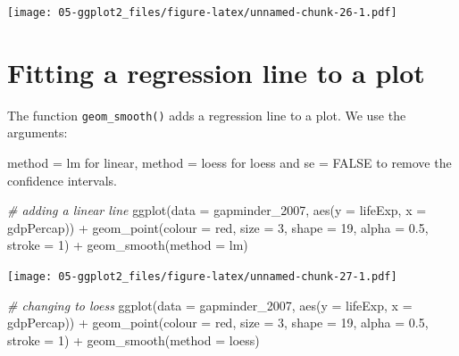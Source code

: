 \documentclass[
]{book}
\newenvironment{Shaded}{\begin{snugshade}}{\end{snugshade}}
\newcommand{\AttributeTok}[1]{\textcolor[rgb]{0.77,0.63,0.00}{#1}}
\newcommand{\CommentTok}[1]{\textcolor[rgb]{0.56,0.35,0.01}{\textit{#1}}}
\newcommand{\DecValTok}[1]{\textcolor[rgb]{0.00,0.00,0.81}{#1}}
\newcommand{\FloatTok}[1]{\textcolor[rgb]{0.00,0.00,0.81}{#1}}
\newcommand{\FunctionTok}[1]{\textcolor[rgb]{0.00,0.00,0.00}{#1}}
\newcommand{\NormalTok}[1]{#1}
\newcommand{\SpecialCharTok}[1]{\textcolor[rgb]{0.00,0.00,0.00}{#1}}
\newcommand{\StringTok}[1]{\textcolor[rgb]{0.31,0.60,0.02}{#1}}
\begin{document}
\texttt{[image: 05-ggplot2\_files/figure-latex/unnamed-chunk-26-1.pdf]}

\hypertarget{fitting-a-regression-line-to-a-plot}{%
\section{Fitting a regression line to a plot}\label{fitting-a-regression-line-to-a-plot}}

The function \texttt{geom\_smooth()} adds a regression line to a plot. We use the arguments:

method = lm for linear,
method = loess for loess and
se = FALSE to remove the confidence intervals.

\begin{Shaded}
\begin{Highlighting}[]
\CommentTok{\# adding a linear line}
\FunctionTok{ggplot}\NormalTok{(}\AttributeTok{data =}\NormalTok{ gapminder\_2007, }\FunctionTok{aes}\NormalTok{(}\AttributeTok{y =}\NormalTok{ lifeExp, }\AttributeTok{x =}\NormalTok{ gdpPercap)) }\SpecialCharTok{+} 
  \FunctionTok{geom\_point}\NormalTok{(}\AttributeTok{colour =} \StringTok{\textquotesingle{}red\textquotesingle{}}\NormalTok{, }\AttributeTok{size =} \DecValTok{3}\NormalTok{, }\AttributeTok{shape =} \DecValTok{19}\NormalTok{, }\AttributeTok{alpha =} \FloatTok{0.5}\NormalTok{, }\AttributeTok{stroke =} \DecValTok{1}\NormalTok{) }\SpecialCharTok{+}
  \FunctionTok{geom\_smooth}\NormalTok{(}\AttributeTok{method =}\NormalTok{ lm)}
\end{Highlighting}
\end{Shaded}

\texttt{[image: 05-ggplot2\_files/figure-latex/unnamed-chunk-27-1.pdf]}

\begin{Shaded}
\begin{Highlighting}[]
\CommentTok{\# changing to loess}
\FunctionTok{ggplot}\NormalTok{(}\AttributeTok{data =}\NormalTok{ gapminder\_2007, }\FunctionTok{aes}\NormalTok{(}\AttributeTok{y =}\NormalTok{ lifeExp, }\AttributeTok{x =}\NormalTok{ gdpPercap)) }\SpecialCharTok{+} 
  \FunctionTok{geom\_point}\NormalTok{(}\AttributeTok{colour =} \StringTok{\textquotesingle{}red\textquotesingle{}}\NormalTok{, }\AttributeTok{size =} \DecValTok{3}\NormalTok{, }\AttributeTok{shape =} \DecValTok{19}\NormalTok{, }\AttributeTok{alpha =} \FloatTok{0.5}\NormalTok{, }\AttributeTok{stroke =} \DecValTok{1}\NormalTok{) }\SpecialCharTok{+}
  \FunctionTok{geom\_smooth}\NormalTok{(}\AttributeTok{method =}\NormalTok{ loess)}
\end{Highlighting}
\end{Shaded}
\end{document}
